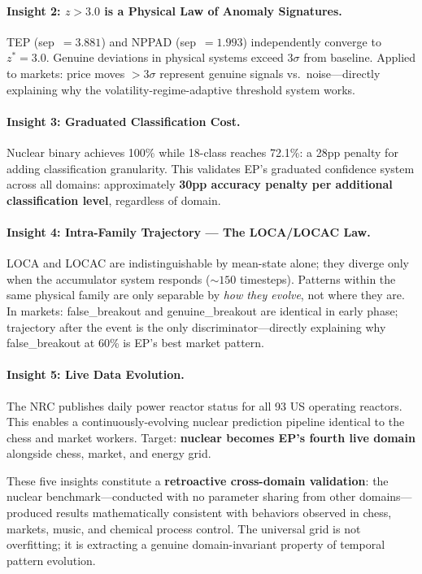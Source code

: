 \documentclass[12pt,a4paper]{article}
\begin{document}
\paragraph{Insight 2: $z{>}3.0$ is a Physical Law of Anomaly Signatures.}
TEP (sep~$=3.881$) and NPPAD (sep~$=1.993$) independently converge to $z^*{=}3.0$. Genuine
deviations in physical systems exceed $3\sigma$ from baseline. Applied to markets: price moves
${>}3\sigma$ represent genuine signals vs.\ noise---directly explaining why the
volatility-regime-adaptive threshold system works.

\paragraph{Insight 3: Graduated Classification Cost.}
Nuclear binary achieves 100\% while 18-class reaches 72.1\%: a 28pp penalty for adding
classification granularity. This validates EP's graduated confidence system across all domains:
approximately \textbf{30pp accuracy penalty per additional classification level}, regardless of
domain.

\paragraph{Insight 4: Intra-Family Trajectory --- The LOCA/LOCAC Law.}
LOCA and LOCAC are indistinguishable by mean-state alone; they diverge only when the accumulator
system responds (${\sim}150$ timesteps). Patterns within the same physical family are only
separable by \emph{how they evolve}, not where they are. In markets: false\_breakout and
genuine\_breakout are identical in early phase; trajectory after the event is the only
discriminator---directly explaining why false\_breakout at 60\% is EP's best market pattern.

\paragraph{Insight 5: Live Data Evolution.}
The NRC publishes daily power reactor status for all 93 US operating reactors. This enables a
continuously-evolving nuclear prediction pipeline identical to the chess and market workers.
Target: \textbf{nuclear becomes EP's fourth live domain} alongside chess, market, and energy grid.

These five insights constitute a \textbf{retroactive cross-domain validation}: the nuclear
benchmark---conducted with no parameter sharing from other domains---produced results mathematically
consistent with behaviors observed in chess, markets, music, and chemical process control. The
universal grid is not overfitting; it is extracting a genuine domain-invariant property of temporal
pattern evolution.
\end{document}
